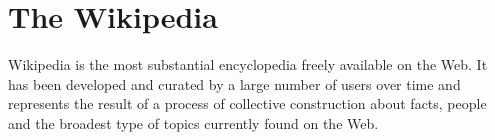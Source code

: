 



\section{\hspace*{3pt} The Wikipedia}


Wikipedia is the most substantial encyclopedia freely available on the Web. It has been developed and curated by a large number of users over time and represents the result of a process of collective construction about facts, people and the broadest type of topics currently found on the Web.

